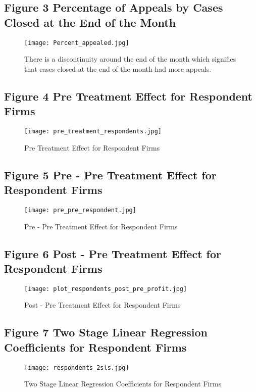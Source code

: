 \documentclass[12pt]{article}
\begin{document}
\subsection{Figure 3 Percentage of Appeals by Cases Closed at the End of the Month}
\begin{figure}[H]   
  \label{fig:figure3}
    \centering
    \texttt{[image: Percent\_appealed.jpg]}
    \caption{There is a discontinuity around the end of the month which signifies that 
    cases closed at the end of the month had more appeals.}
\end{figure}
\subsection{Figure 4 Pre Treatment Effect for Respondent Firms}
\begin{figure}[H]
  \label{fig:figure4}
    \centering
    \texttt{[image: pre\_treatment\_respondents.jpg]}
    \caption{Pre Treatment Effect for Respondent Firms}
\end{figure}
\subsection{Figure 5 Pre - Pre Treatment Effect for Respondent Firms}
\begin{figure}[H]
  \label{fig:figure5}
    \centering
    \texttt{[image: pre\_pre\_respondent.jpg]}
    \caption{Pre - Pre Treatment Effect for Respondent Firms}
\end{figure}
\subsection{Figure 6 Post - Pre Treatment Effect for Respondent Firms}
\begin{figure}[H]
  \label{fig:figure6}
    \centering
    \texttt{[image: plot\_respondents\_post\_pre\_profit.jpg]}
    \caption{Post - Pre Treatment Effect for Respondent Firms}
\end{figure}
\subsection{Figure 7 Two Stage Linear Regression Coefficients for Respondent Firms}
\begin{figure}[H]
  \label{fig:figure7}
    \centering
    \texttt{[image: respondents\_2sls.jpg]}
    \caption{Two Stage Linear Regression Coefficients for Respondent Firms}
\end{figure}
\end{document}
